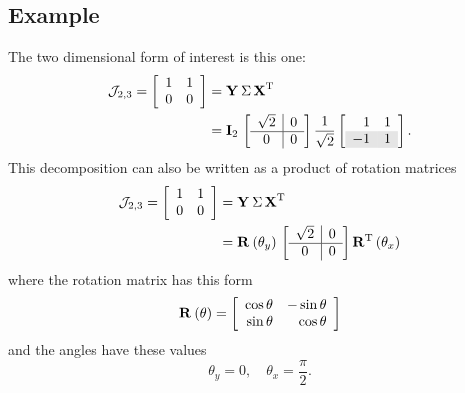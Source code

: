 \subsection{Example}
The two dimensional form of interest is this one:
\begin{equation}
  \begin{split}
    \mathcal{J}_{2,3} = \mat{cc}{1&1\\0&0} &= \svd{T}\\
      &= \I{2}\, \mat{c|c}{\sqrt{2} & 0\\\hline0 & 0} \stwo\mat{rr}{1&1\\\rowcolor{ltgray}
-1&1}.
  \end{split}
\end{equation}
This decomposition can also be written as a product of rotation matrices
\begin{equation}
  \begin{split}
    \mathcal{J}_{2,3} = \mat{cc}{1&1\\0&0} &= \svd{T}\\
      &= \rat{\theta_{y}}{}\, \mat{c|c}{\sqrt{2} & 0\\\hline
0 & 0} \rat{\theta_{x}}{T}
  \end{split}
\end{equation}
where the rotation matrix has this form
\begin{equation}
  \rat{\theta}{} = \mat{rr}{\cos\theta & -\sin\theta\\\sin\theta&\cos\theta}
\end{equation}
and the angles have these values
\begin{equation}
  \theta_{y} = 0, \quad \theta_{x} = \frac{\pi}{2}.
\end{equation}

